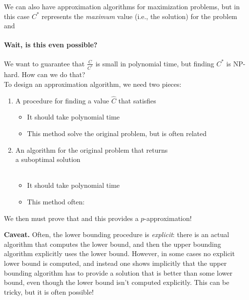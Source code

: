 \documentclass[11  pt]{article}
\begin{document}
	We can also have approximation algorithms for maximization problems, but in this case $C^*$ represents the \emph{maximum} value (i.e., the solution) for the problem and  %
	
	
	
	\newpage
	
	\paragraph{Wait, is this even possible?}
	We want to guarantee that $\frac{C}{C^*}$ is small in polynomial time, but finding $C^*$ is NP-hard. How can we do that? \\
	
	To design an approximation algorithm, we need two pieces:
	\begin{enumerate}
		\item {} A procedure for finding a value $\hat{C}$ that satisfies 
		\begin{itemize}
			\item It should take polynomial time \\
			\item This method  solve the original problem, but is often related
		\end{itemize}
		\item {} An algorithm for the original problem that returns \\
		
		a suboptimal solution  \\ \\
		\begin{itemize}
			\item It should take polynomial time \\
			\item This method often: \\
		\end{itemize}
	\end{enumerate}
	
	We then must prove that  and this provides a $p$-approximation! 
	
	\vfill
	
	
	\textbf{Caveat.} Often, the lower bounding procedure is \emph{explicit}: there is an actual algorithm that computes the lower bound, and then the upper bounding algorithm explicitly uses the lower bound. However, in some cases no explicit lower bound is computed, and instead one shows implicitly that the upper bounding algorithm has to provide a solution that is better than some lower bound, even though the lower bound isn't computed explicitly. This can be tricky, but it is often possible!
	
\end{document}
